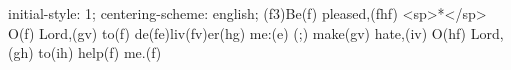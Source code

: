initial-style: 1;
centering-scheme: english;
(f3)Be(f) pleased,(fhf) <sp>*</sp> O(f) Lord,(gv) to(f) de(fe)liv(fv)er(hg) me:(e) (;) make(gv) hate,(iv) O(hf) Lord,(gh) to(ih) help(f) me.(f)
